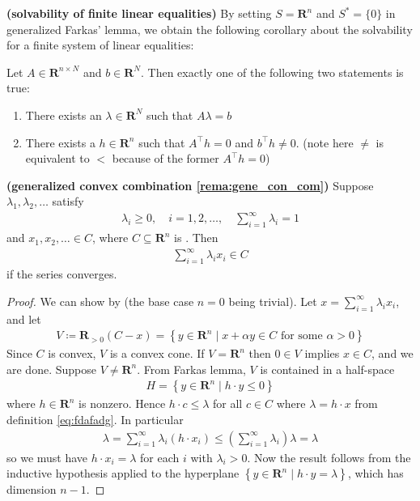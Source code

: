 \documentclass{article}
\newcommand{\bfs}[1]{\textbf{({#1}) }}
\begin{document}
\begin{rema}{\bfs{solvability  of finite linear equalities}}
By setting $S=\mathbf{R}^{n}$ and $S^{*}=\{0\}$ in generalized Farkas' lemma, we obtain the following corollary about the solvability for a finite system of linear equalities:

 Let $A \in \mathbf{R}^{n \times N}$ and $b \in \mathbf{R}^{N}$. Then exactly one of the following two statements is true:
\begin{enumerate}
    \item There exists an $\lambda \in \mathbf{R}^{N}$ such that ${A \lambda}=b$
    \item There exists a ${h} \in \mathbf{R}^{n}$ such that $A^{\top} {h}={0}$ and $b^{\top} {h} \neq {0}$.  (note here $\ne$ is equivalent to $<$ because of the former  $A^{\top} {h}={0}$)
\end{enumerate}
\end{rema}


\begin{cora}{\bfs{generalized convex combination \cref{rema:gene_con_com}}}\label{cora:gene_con_com}
Suppose $\lambda_{1}, \lambda_{2}, \ldots$ satisfy
\begin{align*}
\lambda_{i} \geq 0, \quad i=1,2, \ldots, \quad \sum_{i=1}^{\infty} \lambda_{i}=1
\end{align*}
and $x_{1}, x_{2}, \ldots \in C$, where $C \subseteq \mathbf{R}^{n}$ is . Then
\begin{align}
\sum_{i=1}^{\infty} \lambda_{i} x_{i} \in C \label{eq:inf_sum}
\end{align}
if the series converges.
\end{cora}
\begin{proof}\color{ForestGreen}
We can show by  (the base case $n=0$ being trivial). Let $x=\sum_{i=1}^{\infty} \lambda_{i} x_{i}$, and let
\begin{align}
V\coloneqq\mathbf{R}_{>0}(C-x)=\left\{y \in \mathbf{R}^{n} \mid x+\alpha y \in C \text { for some } \alpha>0\right\}\label{eq:fdafadg}
\end{align}
Since $C$ is convex, $V$ is a convex cone. If $V=\mathbf{R}^{n}$ then $0 \in V$ implies $x \in C$, and we are done. Suppose $V \neq \mathbf{R}^{n}$. From Farkas lemma, $V$ is contained in a half-space
\begin{align*}
H=\left\{y \in \mathbf{R}^{n} \mid h \cdot y \leq 0\right\}
\end{align*}
where $h \in \mathbf{R}^{n}$ is nonzero. Hence $h \cdot c \leq \lambda$ for all $c \in C$ where $\lambda=h \cdot x$ from definition \cref{eq:fdafadg}. In particular
\begin{align*}
\lambda=\sum_{i=1}^{\infty} \lambda_{i}\left(h \cdot x_{i}\right) \leq\left(\sum_{i=1}^{\infty} \lambda_{i}\right) \lambda=\lambda
\end{align*}
so we must have $h \cdot x_{i}=\lambda$ for each $i$ with $\lambda_{i}>0$. Now the result follows from the inductive hypothesis applied to the hyperplane
$\left\{y \in \mathbf{R}^{n} \mid h \cdot y=\lambda\right\}$, which has dimension $n-1$.
\end{proof} 
\end{document}
